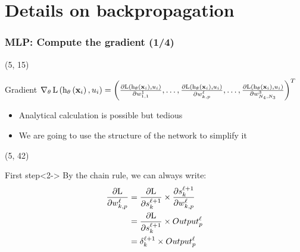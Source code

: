 \section{Details on backpropagation}

\begin{frame}[label=Backpropagation]
  \frametitle{\acl{MLP}: Compute the gradient (1/4)}

  \begin{textblock}{90}(5, 15)
    \begin{block}{Gradient}
      $
      \operatorname{\nabla}_{\mathbf{\theta}} \mathrm{L} \left ( {\mathrm{h}_{\mathbf{\theta}} \left ( {\mathbf{x}_i} \right ), u_i} \right ) =
      \left( \frac{\partial \mathrm{L} \left ( {\mathrm{h}_{\mathbf{\theta}} \left ( {\mathbf{x}_i} \right ),
            u_i} \right )}{\partial w_{1,1}^1}, \ldots, \frac{\partial \mathrm{L} \left ( {\mathrm{h}_{\mathbf{\theta}} \left ( {\mathbf{x}_i} \right ), u_i} \right )}{\partial w_{k,p}^{\ell}},\ldots,\frac{\partial \mathrm{L} \left ( {\mathrm{h}_{\mathbf{\theta}} \left ( {\mathbf{x}_i} \right ), u_i} \right )}{\partial w_{N_{4},N_{3}}^{3}} \right)^T
      $

      \begin{itemize}
      \item Analytical calculation is possible but tedious
      \item We are going to use the structure of the network to simplify it
      \end{itemize}
    \end{block}
  \end{textblock}

  \begin{textblock}{90}(5, 42)
    \begin{block}{First step}<2->
      By the chain rule, we can always write:
      \begin{equation*}
        \begin{split}
          \frac{\partial \mathrm{L}}{\partial w_{k,p}^{\ell}} & =
             \frac{\partial \mathrm{L}}{\partial s_{k}^{\ell+1}} \times \frac{\partial s_{k}^{\ell+1}}{\partial w_{k,p}^{\ell}} \\
                                                    & =
                                                      \frac{\partial \mathrm{L}}{\partial s_{k}^{\ell+1}} \times Output_{p}^{\ell} \\
                                                     & =
                                                       \delta_{k}^{\ell+1} \times Output_{p}^{\ell}
        \end{split}
      \end{equation*}
    \end{block}
  \end{textblock}
\end{frame}

